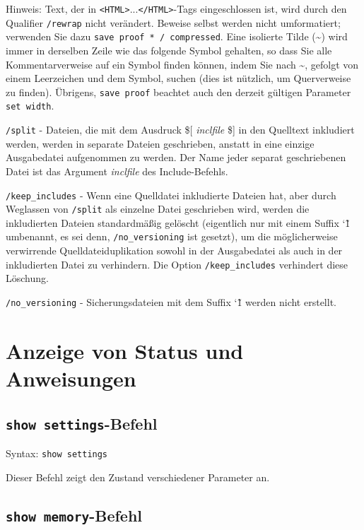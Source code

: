 Hinweis: Text, der in \texttt{<HTML>}...\texttt{</HTML>}-Tags eingeschlossen ist, wird durch den Qualifier \texttt{/rewrap} nicht verändert. Beweise selbst werden nicht umformatiert; verwenden Sie dazu \texttt{save proof * / compressed}. Eine isolierte Tilde (\~{}) wird immer in derselben Zeile wie das folgende Symbol gehalten, so dass Sie alle Kommentarverweise auf ein Symbol finden können, indem Sie nach \~{}, gefolgt von einem Leerzeichen und dem Symbol, suchen (dies ist nützlich, um Querverweise zu finden). Übrigens, \texttt{save proof} beachtet auch den derzeit gültigen Parameter \texttt{set width}.

\texttt{/split} -
Dateien, die mit dem Ausdruck \$[ \textit{inclfile} \$] in den Quelltext inkludiert werden, werden in separate Dateien geschrieben, anstatt in eine einzige Ausgabedatei aufgenommen zu werden.  Der Name jeder separat geschriebenen Datei ist das Argument \textit{inclfile} des Include-Befehls.

\texttt{/keep\_includes} -
Wenn eine Quelldatei inkludierte Dateien hat, aber durch Weglassen von \texttt{/split} als einzelne Datei geschrieben wird, werden die inkludierten Dateien standardmäßig gelöscht (eigentlich nur mit einem Suffix \char`\~1 umbenannt, es sei denn, \texttt{/no\_versioning} ist gesetzt), um die möglicherweise verwirrende Quelldateiduplikation sowohl in der Ausgabedatei als auch in der inkludierten Datei zu verhindern. Die Option \texttt{/keep\_includes} verhindert diese Löschung.

\texttt{/no\_versioning} -
Sicherungsdateien mit dem Suffix \char`\~1 werden nicht erstellt.


\section{Anzeige von Status und Anweisungen}

\subsection{\texttt{show settings}-Befehl}

Syntax:  \texttt{show settings}

Dieser Befehl zeigt den Zustand verschiedener Parameter an.

\subsection{\texttt{show memory}-Befehl}

